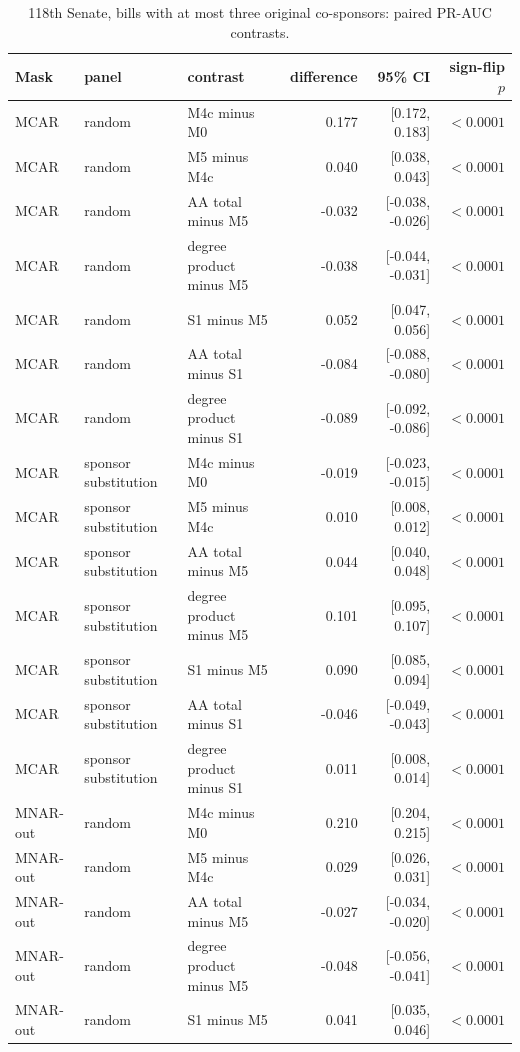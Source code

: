 \begin{table}[tbp]
\centering
\small
\caption{118th Senate, bills with at most three original co-sponsors: paired PR-AUC contrasts.}
\label{tab:senate-limit-sensitivity}
\begin{tabular}{lllrrr}
\toprule
Mask & panel & contrast & difference & 95\% CI & sign-flip $p$ \\
\midrule
MCAR & random & M4c minus M0 & 0.177 & [0.172, 0.183] & $<0.0001$ \\
MCAR & random & M5 minus M4c & 0.040 & [0.038, 0.043] & $<0.0001$ \\
MCAR & random & AA total minus M5 & -0.032 & [-0.038, -0.026] & $<0.0001$ \\
MCAR & random & degree product minus M5 & -0.038 & [-0.044, -0.031] & $<0.0001$ \\
MCAR & random & S1 minus M5 & 0.052 & [0.047, 0.056] & $<0.0001$ \\
MCAR & random & AA total minus S1 & -0.084 & [-0.088, -0.080] & $<0.0001$ \\
MCAR & random & degree product minus S1 & -0.089 & [-0.092, -0.086] & $<0.0001$ \\
MCAR & sponsor substitution & M4c minus M0 & -0.019 & [-0.023, -0.015] & $<0.0001$ \\
MCAR & sponsor substitution & M5 minus M4c & 0.010 & [0.008, 0.012] & $<0.0001$ \\
MCAR & sponsor substitution & AA total minus M5 & 0.044 & [0.040, 0.048] & $<0.0001$ \\
MCAR & sponsor substitution & degree product minus M5 & 0.101 & [0.095, 0.107] & $<0.0001$ \\
MCAR & sponsor substitution & S1 minus M5 & 0.090 & [0.085, 0.094] & $<0.0001$ \\
MCAR & sponsor substitution & AA total minus S1 & -0.046 & [-0.049, -0.043] & $<0.0001$ \\
MCAR & sponsor substitution & degree product minus S1 & 0.011 & [0.008, 0.014] & $<0.0001$ \\
MNAR-out & random & M4c minus M0 & 0.210 & [0.204, 0.215] & $<0.0001$ \\
MNAR-out & random & M5 minus M4c & 0.029 & [0.026, 0.031] & $<0.0001$ \\
MNAR-out & random & AA total minus M5 & -0.027 & [-0.034, -0.020] & $<0.0001$ \\
MNAR-out & random & degree product minus M5 & -0.048 & [-0.056, -0.041] & $<0.0001$ \\
MNAR-out & random & S1 minus M5 & 0.041 & [0.035, 0.046] & $<0.0001$ \\

\end{tabular}
\end{table}
